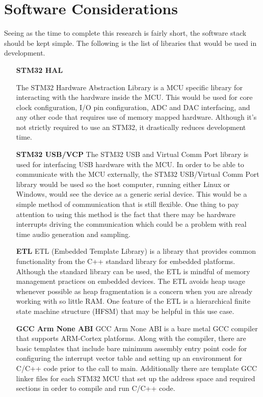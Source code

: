 \documentclass{article}[12pt,a4paper]
\begin{document}
\section*{Software Considerations}

Seeing as the time to complete this research is fairly short, the software stack should be kept simple. The following is the list of libraries that would be used in development.

\begin{itemize}
  \item[\textbf{STM32 HAL}]

  The STM32 Hardware Abstraction Library is a MCU specific library for interacting with the hardware inside the MCU. This would be used for core clock configuration, I/O pin configuration, ADC and DAC interfacing, and any other code that requires use of memory mapped hardware. Although it's not strictly required to use an STM32, it drastically reduces development time.

  
  \item[\textbf{STM32 USB/VCP}]
  The STM32 USB and Virtual Comm Port library is used for interfacing USB hardware with the MCU. In order to be able to communicate with the MCU externally, the STM32 USB/Virtual Comm Port library would be used so the host computer, running either Linux or Windows, would see the device as a generic serial device. This would be a simple method of communication that is still flexible. One thing to pay attention to using this method is the fact that there may be hardware interrupts driving the communication which could be a problem with real time audio generation and sampling.

  \item[\textbf{ETL}]
  ETL (Embedded Template Library) is a library that provides common functionality from the C++ standard library for embedded platforms. Although the standard library can be used, the ETL is mindful of memory management practices on embedded devices. The ETL avoids heap usage whenever possible as heap fragmentation is a concern when you are already working with so little RAM. One feature of the ETL is a hierarchical finite state machine structure (HFSM) that may be helpful in this use case.

  \item[\textbf{GCC Arm None ABI}]
  GCC Arm None ABI is a bare metal GCC compiler that supports ARM-Cortex platforms. Along with the compiler, there are basic templates that include bare minimum assembly entry point code for configuring the interrupt vector table and setting up an environment for C/C++ code prior to the call to main. Additionally there are template GCC linker files for each STM32 MCU that set up the address space and required sections in order to compile and run C/C++ code.

\end{itemize}



\end{document}
